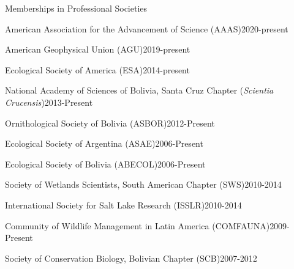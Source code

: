 \documentclass{resume} %
\begin{document}
\begin{rSection}{Memberships in Professional Societies}

\begin{esSubsection}{American Association for the Advancement of Science }{(AAAS)}{2020-present}{}{}
\end{esSubsection}

\begin{esSubsection}{American Geophysical Union  }{(AGU)}{2019-present}{}{}
\end{esSubsection}

\begin{esSubsection}{Ecological Society of America }{(ESA)}{2014-present}{}{}
\end{esSubsection}

\begin{esSubsection}{National Academy of Sciences of Bolivia, Santa Cruz Chapter }{({\em Scientia Crucensis})}{2013-Present}{}{}
\end{esSubsection}


\begin{esSubsection}{Ornithological Society of Bolivia }{(ASBOR)}{2012-Present}{}{}
\end{esSubsection}

\begin{esSubsection}{Ecological Society of Argentina }{(ASAE)}{2006-Present}{}{}
\end{esSubsection}

\begin{esSubsection}{Ecological Society of Bolivia }{(ABECOL)}{2006-Present}{}{}
\end{esSubsection}

\begin{esSubsection}{Society of Wetlands Scientists, South American Chapter }{(SWS)}{2010-2014}{}{}
\end{esSubsection}

\begin{esSubsection}{International Society for Salt Lake Research }{(ISSLR)}{2010-2014}{}{}
\end{esSubsection}

\begin{esSubsection}{Community of Wildlife Management in Latin America }{(COMFAUNA)}{2009-Present}{}{}
\end{esSubsection}

\begin{esSubsection}{Society of Conservation Biology, Bolivian Chapter }{(SCB)}{2007-2012}{}{}
\end{esSubsection}

\end{rSection}



\clearpage
\end{document}

